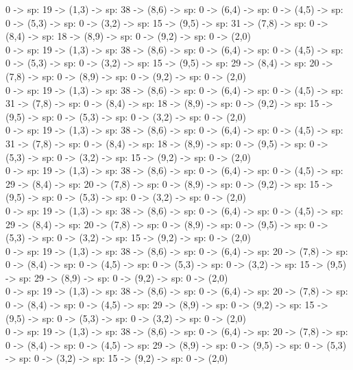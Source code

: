 \documentclass[10pt,a4paper]{article}
\begin{document}
0 -> sp: 19 -> (1,3) -> sp: 38 -> (8,6) -> sp: 0 -> (6,4) -> sp: 0 -> (4,5) -> sp: 0 -> (5,3) -> sp: 0 -> (3,2) -> sp: 15 -> (9,5) -> sp: 31 -> (7,8) -> sp: 0 -> (8,4) -> sp: 18 -> (8,9) -> sp: 0 -> (9,2) -> sp: 0 -> (2,0)\\

0 -> sp: 19 -> (1,3) -> sp: 38 -> (8,6) -> sp: 0 -> (6,4) -> sp: 0 -> (4,5) -> sp: 0 -> (5,3) -> sp: 0 -> (3,2) -> sp: 15 -> (9,5) -> sp: 29 -> (8,4) -> sp: 20 -> (7,8) -> sp: 0 -> (8,9) -> sp: 0 -> (9,2) -> sp: 0 -> (2,0)\\

0 -> sp: 19 -> (1,3) -> sp: 38 -> (8,6) -> sp: 0 -> (6,4) -> sp: 0 -> (4,5) -> sp: 31 -> (7,8) -> sp: 0 -> (8,4) -> sp: 18 -> (8,9) -> sp: 0 -> (9,2) -> sp: 15 -> (9,5) -> sp: 0 -> (5,3) -> sp: 0 -> (3,2) -> sp: 0 -> (2,0)\\

0 -> sp: 19 -> (1,3) -> sp: 38 -> (8,6) -> sp: 0 -> (6,4) -> sp: 0 -> (4,5) -> sp: 31 -> (7,8) -> sp: 0 -> (8,4) -> sp: 18 -> (8,9) -> sp: 0 -> (9,5) -> sp: 0 -> (5,3) -> sp: 0 -> (3,2) -> sp: 15 -> (9,2) -> sp: 0 -> (2,0)\\

0 -> sp: 19 -> (1,3) -> sp: 38 -> (8,6) -> sp: 0 -> (6,4) -> sp: 0 -> (4,5) -> sp: 29 -> (8,4) -> sp: 20 -> (7,8) -> sp: 0 -> (8,9) -> sp: 0 -> (9,2) -> sp: 15 -> (9,5) -> sp: 0 -> (5,3) -> sp: 0 -> (3,2) -> sp: 0 -> (2,0)\\

0 -> sp: 19 -> (1,3) -> sp: 38 -> (8,6) -> sp: 0 -> (6,4) -> sp: 0 -> (4,5) -> sp: 29 -> (8,4) -> sp: 20 -> (7,8) -> sp: 0 -> (8,9) -> sp: 0 -> (9,5) -> sp: 0 -> (5,3) -> sp: 0 -> (3,2) -> sp: 15 -> (9,2) -> sp: 0 -> (2,0)\\

0 -> sp: 19 -> (1,3) -> sp: 38 -> (8,6) -> sp: 0 -> (6,4) -> sp: 20 -> (7,8) -> sp: 0 -> (8,4) -> sp: 0 -> (4,5) -> sp: 0 -> (5,3) -> sp: 0 -> (3,2) -> sp: 15 -> (9,5) -> sp: 29 -> (8,9) -> sp: 0 -> (9,2) -> sp: 0 -> (2,0)\\

0 -> sp: 19 -> (1,3) -> sp: 38 -> (8,6) -> sp: 0 -> (6,4) -> sp: 20 -> (7,8) -> sp: 0 -> (8,4) -> sp: 0 -> (4,5) -> sp: 29 -> (8,9) -> sp: 0 -> (9,2) -> sp: 15 -> (9,5) -> sp: 0 -> (5,3) -> sp: 0 -> (3,2) -> sp: 0 -> (2,0)\\

0 -> sp: 19 -> (1,3) -> sp: 38 -> (8,6) -> sp: 0 -> (6,4) -> sp: 20 -> (7,8) -> sp: 0 -> (8,4) -> sp: 0 -> (4,5) -> sp: 29 -> (8,9) -> sp: 0 -> (9,5) -> sp: 0 -> (5,3) -> sp: 0 -> (3,2) -> sp: 15 -> (9,2) -> sp: 0 -> (2,0)\\
\end{document}
